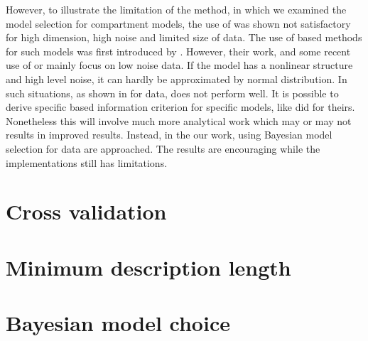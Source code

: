 However, to illustrate the limitation of the \aicc method, in
\cite{Zhou:2011uo} which we examined the model selection for compartment
models, the use of \aicc was shown not satisfactory for high dimension, high
noise and limited size of data. The use of \aic based methods for such models
was first introduced by \cite{Hawkins:1986ha}. However, their work, and some
recent use of \aic or \aicc mainly focus on low noise data. If the model has a
nonlinear structure and high level noise, it can hardly be approximated by
normal distribution. In such situations, as shown in \cite{Zhou:2011uo} for
\pet data, \aicc does not perform well. It is possible to derive specific \aic
based information criterion for specific models, like \cite{Hurvich:1989ev}
did for theirs. Nonetheless this will involve much more analytical work which
may or may not results in improved results.  Instead, in the our work, using
Bayesian model selection for \pet data are approached. The results are
encouraging while the implementations still has limitations.

\section{Cross validation}
\label{sec:Cross validation}

\section{Minimum description length}
\label{sec:Minimum description length}


\section{Bayesian model choice}
\label{sec:Bayesian model choice}

